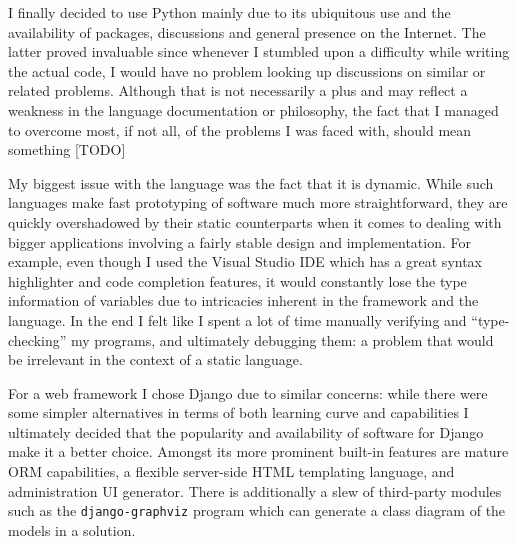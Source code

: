 \documentclass[bsc,frontabs,twoside,singlespacing,parskip,deptreport]{infthesis}     %
\begin{document}
    I finally decided to use Python mainly due to its ubiquitous use and the availability of packages, discussions and general presence on the Internet. The latter proved invaluable since whenever I stumbled upon a difficulty while writing the actual code, I would have no problem looking up discussions on similar or related problems. Although that is not necessarily a plus and may reflect a weakness in the language documentation or philosophy, the fact that I managed to overcome most, if not all, of the problems I was faced with, should mean something [TODO]

    My biggest issue with the language was the fact that it is dynamic. While such languages make fast prototyping of software much more straightforward, they are quickly overshadowed by their static counterparts when it comes to dealing with bigger applications involving a fairly stable design and implementation. For example, even though I used the Visual Studio IDE which has a great syntax highlighter and code completion features, it would constantly lose the type information of variables due to intricacies inherent in the framework and the language. In the end I felt like I spent a lot of time manually verifying and ``type-checking'' my programs, and ultimately debugging them: a problem that would be irrelevant in the context of a static language.
    
    For a web framework I chose Django due to similar concerns: while there were some simpler alternatives in terms of both learning curve and capabilities I ultimately decided that the popularity and availability of software for Django make it a better choice. Amongst its more prominent built-in features are mature ORM capabilities, a flexible server-side HTML templating language, and administration UI generator. There is additionally a slew of third-party modules such as the {\tt django-graphviz} program which can generate a class diagram of the models in a solution.
\end{document}
